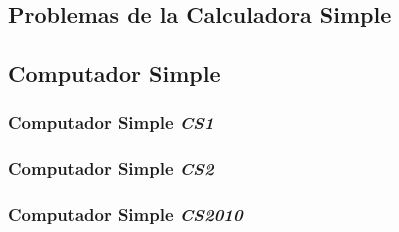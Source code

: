 \subsection{Problemas de la Calculadora Simple}
\subsection{Computador Simple}
\subsubsection{Computador Simple \textit{CS1}}
\subsubsection{Computador Simple \textit{CS2}}
\subsubsection{Computador Simple \textit{CS2010}}